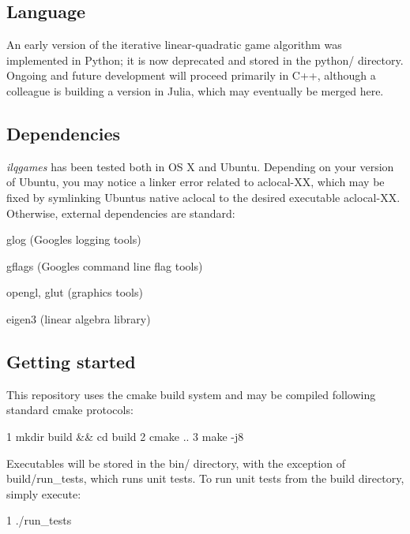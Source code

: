 \subsection*{Language}

An early version of the iterative linear-\/quadratic game algorithm was implemented in Python; it is now deprecated and stored in the {\ttfamily python/} directory. Ongoing and future development will proceed primarily in C++, although a colleague is building a version in Julia, which may eventually be merged here.

\subsection*{Dependencies}

{\itshape ilqgames} has been tested both in OS X and Ubuntu. Depending on your version of Ubuntu, you may notice a linker error related to {\ttfamily aclocal-\/\+XX}, which may be fixed by symlinking Ubuntu\textquotesingle{}s native {\ttfamily aclocal} to the desired executable {\ttfamily aclocal-\/\+XX}. Otherwise, external dependencies are standard\+:


\begin{DoxyItemize}
\item {\ttfamily glog} (Google\textquotesingle{}s logging tools)
\item {\ttfamily gflags} (Google\textquotesingle{}s command line flag tools)
\item {\ttfamily opengl}, {\ttfamily glut} (graphics tools)
\item {\ttfamily eigen3} (linear algebra library)
\end{DoxyItemize}

\subsection*{Getting started}

This repository uses the {\ttfamily cmake} build system and may be compiled following standard cmake protocols\+: 
\begin{DoxyCode}
1 mkdir build && cd build
2 cmake ..
3 make -j8
\end{DoxyCode}


Executables will be stored in the {\ttfamily bin/} directory, with the exception of {\ttfamily build/run\+\_\+tests}, which runs unit tests. To run unit tests from the build directory, simply execute\+: 
\begin{DoxyCode}
1 ./run\_tests
\end{DoxyCode}


